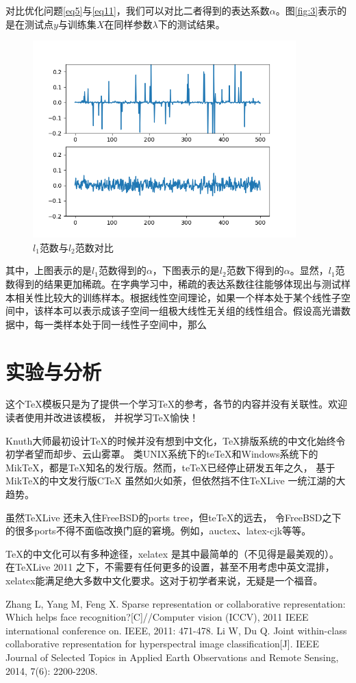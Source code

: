 \documentclass[12pt,a4paper]{article}
\begin{document}
对比优化问题\eqref{eq5}与\eqref{eq11}，我们可以对比二者得到的表达系数$\alpha$。图\eqref{fig:3}表示的是在测试点$y$与训练集$X$在同样参数$\lambda$下的测试结果。
\begin{figure}[H] 
\center
\includegraphics[width=4in]{l2_vs_l1.png} 
\caption{$l_{1}$范数与$l_{2}$范数对比}
\label{fig:3} 
\end{figure}
其中，上图表示的是$l_{1}$范数得到的$\alpha$，下图表示的是$l_{2}$范数下得到的$\alpha$。显然，$l_{1}$范数得到的结果更加稀疏。在字典学习中，稀疏的表达系数往往能够体现出与测试样本相关性比较大的训练样本。根据线性空间理论，如果一个样本处于某个线性子空间中，该样本可以表示成该子空间一组极大线性无关组的线性组合。假设高光谱数据中，每一类样本处于同一线性子空间中，那么



\section{实验与分析}
这个\TeX 模板只是为了提供一个学习\TeX 的参考，各节的内容并没有关联性。欢迎读者使用并改进该模板，
并祝学习\TeX 愉快！

Knuth大师最初设计\TeX 的时候并没有想到中文化，\TeX 排版系统的中文化始终令初学者望而却步、云山雾罩。
类UNIX系统下的teTeX和Windows系统下的MikTeX，都是\TeX 知名的发行版。然而，teTeX已经停止研发五年之久，
基于MikTeX的中文发行版CTeX 虽然如火如荼，但依然挡不住\TeX Live 一统江湖的大趋势。

虽然\TeX Live 还未入住FreeBSD的ports tree，但teTeX的远去，
令FreeBSD之下的很多ports不得不面临改换门庭的窘境。例如，auctex、latex-cjk等等。


\TeX 的中文化可以有多种途径，xelatex 是其中最简单的（不见得是最美观的）。
在\TeX Live 2011 之下，不需要有任何更多的设置，甚至不用考虑中英文混排，
xelatex能满足绝大多数中文化要求。这对于初学者来说，无疑是一个福音。


\begin{thebibliography}{}
 Zhang L, Yang M, Feng X. Sparse representation or collaborative representation: Which helps face recognition?[C]//Computer vision (ICCV), 2011 IEEE international conference on. IEEE, 2011: 471-478.
Li W, Du Q. Joint within-class collaborative representation for hyperspectral image classification[J]. IEEE Journal of Selected Topics in Applied Earth Observations and Remote Sensing, 2014, 7(6): 2200-2208.
\end{thebibliography}
\clearpage
\end{document}
